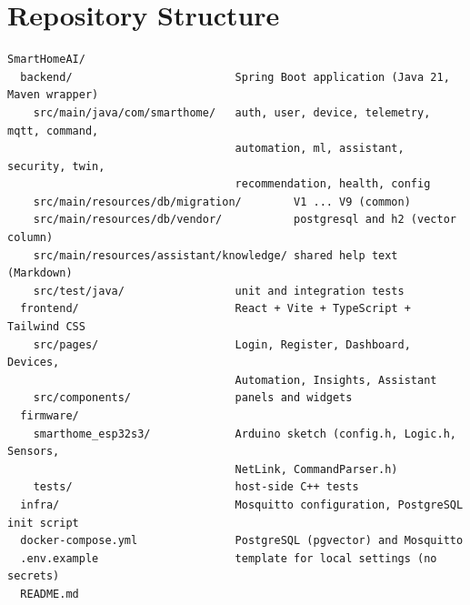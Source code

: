 \documentclass[12pt,a4paper,oneside]{report}
\begin{document}
\chapter{Repository Structure}
\begin{lstlisting}[language={},caption={Top-level layout}]
SmartHomeAI/
  backend/                         Spring Boot application (Java 21, Maven wrapper)
    src/main/java/com/smarthome/   auth, user, device, telemetry, mqtt, command,
                                   automation, ml, assistant, security, twin,
                                   recommendation, health, config
    src/main/resources/db/migration/        V1 ... V9 (common)
    src/main/resources/db/vendor/           postgresql and h2 (vector column)
    src/main/resources/assistant/knowledge/ shared help text (Markdown)
    src/test/java/                 unit and integration tests
  frontend/                        React + Vite + TypeScript + Tailwind CSS
    src/pages/                     Login, Register, Dashboard, Devices,
                                   Automation, Insights, Assistant
    src/components/                panels and widgets
  firmware/
    smarthome_esp32s3/             Arduino sketch (config.h, Logic.h, Sensors,
                                   NetLink, CommandParser.h)
    tests/                         host-side C++ tests
  infra/                           Mosquitto configuration, PostgreSQL init script
  docker-compose.yml               PostgreSQL (pgvector) and Mosquitto
  .env.example                     template for local settings (no secrets)
  README.md
\end{lstlisting}
\end{document}
